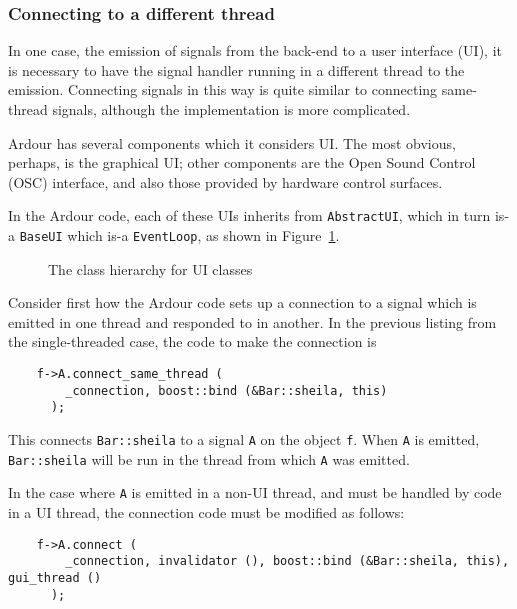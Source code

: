 \documentclass[10pt,a4paper]{book}
\newcommand{\code}[1]{\texttt{#1}}
\begin{document}
\subsubsection{Connecting to a different thread}

In one case, the emission of signals from the back-end to a user
interface (UI), it is necessary to have the signal handler running in
a different thread to the emission.  Connecting signals in this way is
quite similar to connecting same-thread signals, although the
implementation is more complicated.

Ardour has several components which it considers UI\@.  The most
obvious, perhaps, is the graphical UI; other components are the Open
Sound Control (OSC) interface, and also those provided by hardware
control surfaces.

In the Ardour code, each of these UIs inherits from \code{AbstractUI},
which in turn is-a \code{BaseUI} which is-a \code{EventLoop}, as shown
in Figure~\ref{fig:ui-class-hierarchy}.

\begin{figure}[ht]
\begin{center}

\end{center}
\caption{The class hierarchy for UI classes}
\label{fig:ui-class-hierarchy}
\end{figure}

Consider first how the Ardour code sets up a connection to a signal
which is emitted in one thread and responded to in another.  In the previous
listing from the single-threaded case, the code to make the connection is

\begin{lstlisting}
    f->A.connect_same_thread (
        _connection, boost::bind (&Bar::sheila, this)
      );
\end{lstlisting}

This connects \code{Bar::sheila} to a signal \code{A} on the object
\code{f}.  When \code{A} is emitted, \code{Bar::sheila} will be run in the
thread from which \code{A} was emitted.

In the case where \code{A} is emitted in a non-UI thread, and must be
handled by code in a UI thread, the connection code must be modified as
follows:

\begin{lstlisting}
    f->A.connect (
        _connection, invalidator (), boost::bind (&Bar::sheila, this), gui_thread ()
      );
\end{lstlisting}
\end{document}
